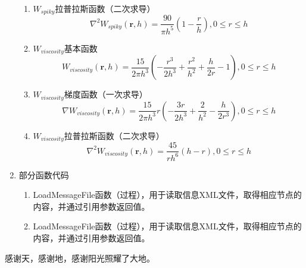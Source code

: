 \documentclass[printMode=false, declarePage=true]{ecnuthesis}
\begin{document}
\begin{appendix}
\begin{enumerate}
\begin{enumerate}
        \item $W_{spiky}$拉普拉斯函数（二次求导）
            \begin{equation}
                \nabla^2 W_{spiky}(\mathbf{r},h) = \frac{90}{\pi h^5}(1-\frac{r}{h}),0\le r \le h 
                \label{con:spiky_3}
            \end{equation}
        \item $W_{viscosity}$基本函数
            \begin{equation}
                W_{viscosity}(\mathbf{r},h) = \frac{15}{2\pi h^3} (-\frac{r^3}{2h^3}+\frac{r^2}{h^2}+\frac{h}{2r}-1),0\le r \le h 
                \label{con:viskernel_1}
            \end{equation}
        \item $W_{viscosity}$梯度函数（一次求导）
            \begin{equation}
                \nabla W_{viscosity}(\mathbf{r},h) = \frac{15}{2\pi h^3} r(-\frac{3r}{2h^3}+\frac{2}{h^2}-\frac{h}{2r^3}),0\le r \le h 
                \label{con:viskernel_2}
            \end{equation}
        \item $W_{viscosity}$拉普拉斯函数（二次求导）
            \begin{equation}
                \nabla^2 W_{viscosity}(\mathbf{r},h) = \frac{45}{r h^6} (h-r),0\le r \le h 
                \label{con:viskernel_3}
            \end{equation}

    \end{enumerate}
    \item 部分函数代码
    \begin{enumerate}
      \item LoadMessageFile函数（过程），用于读取信息XML文件，取得相应节点的内容，并通过引用参数返回值。
      \item LoadMessageFile函数（过程），用于读取信息XML文件，取得相应节点的内容，并通过引用参数返回值。
    \end{enumerate}
  \end{enumerate}
\end{appendix}

\begin{acknowledgement}
  感谢天，感谢地，感谢阳光照耀了大地。
\end{acknowledgement}
\end{document}
